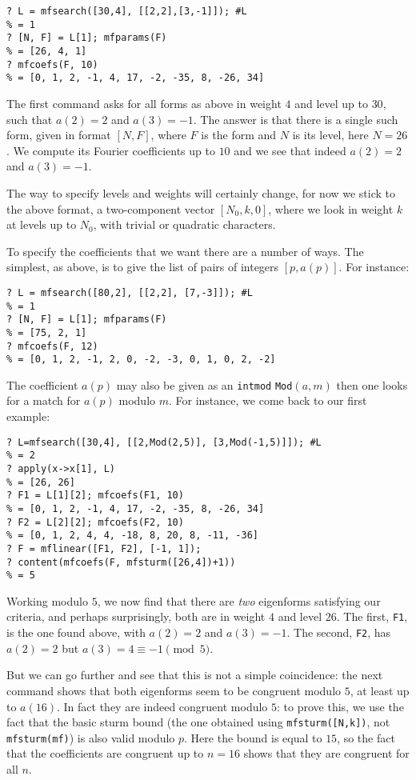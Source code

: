 \documentclass[11pt]{article}
\def\kbd#1{{\tt #1}}
\begin{document}
\begin{verbatim}
? L = mfsearch([30,4], [[2,2],[3,-1]]); #L
% = 1
? [N, F] = L[1]; mfparams(F)
% = [26, 4, 1]
? mfcoefs(F, 10)
% = [0, 1, 2, -1, 4, 17, -2, -35, 8, -26, 34]
\end{verbatim}

The first command asks for all forms as above in weight $4$ and level
up to $30$, such that $a(2)=2$ and $a(3)=-1$. The answer is that there is a
single such form, given in format $[N,F]$, where $F$ is the form
and $N$ is its level, here $N = 26$. We compute its Fourier coefficients up
to $10$ and we see that indeed $a(2)=2$ and $a(3)=-1$.

The way to specify levels and weights will certainly change, for now we
stick to the above format, a two-component vector $[N_0,k,0]$,
where we look in weight $k$ at levels up to $N_0$, with trivial
or quadratic characters.

To specify the coefficients that we want there are a number of ways. The
simplest, as above, is to give the list of pairs of integers $[p,a(p)]$.
For instance:

\begin{verbatim}
? L = mfsearch([80,2], [[2,2], [7,-3]]); #L
% = 1
? [N, F] = L[1]; mfparams(F)
% = [75, 2, 1]
? mfcoefs(F, 12)
% = [0, 1, 2, -1, 2, 0, -2, -3, 0, 1, 0, 2, -2]
\end{verbatim}

The coefficient $a(p)$ may also be given as an \kbd{intmod} \kbd{Mod}$(a,m)$
then one looks for a match for $a(p)$ modulo $m$. For instance, we come
back to our first example:
\begin{verbatim}
? L=mfsearch([30,4], [[2,Mod(2,5)], [3,Mod(-1,5)]]); #L
% = 2
? apply(x->x[1], L)
% = [26, 26]
? F1 = L[1][2]; mfcoefs(F1, 10)
% = [0, 1, 2, -1, 4, 17, -2, -35, 8, -26, 34]
? F2 = L[2][2]; mfcoefs(F2, 10)
% = [0, 1, 2, 4, 4, -18, 8, 20, 8, -11, -36]
? F = mflinear([F1, F2], [-1, 1]);
? content(mfcoefs(F, mfsturm([26,4])+1))
% = 5
\end{verbatim}

Working modulo $5$, we now find that there are \emph{two} eigenforms
satisfying our criteria, and perhaps surprisingly, both are in weight $4$
and level $26$. The first, \kbd{F1}, is the one found above, with
$a(2)=2$ and $a(3)=-1$. The second, \kbd{F2}, has $a(2)=2$ but
$a(3)=4\equiv-1\pmod5$.

But we can go further and see that this is not a simple coincidence:
the next command shows that both eigenforms seem to be congruent modulo $5$,
at least up to $a(16)$. In fact they are indeed congruent modulo $5$:
to prove this, we use the fact that the basic sturm bound (the one obtained
using \kbd{mfsturm([N,k])}, not \kbd{mfsturm(mf)}) is also valid modulo
$p$. Here the bound is equal to $15$, so the fact that the coefficients
are congruent up to $n=16$ shows that they are congruent for all $n$.
\end{document}
